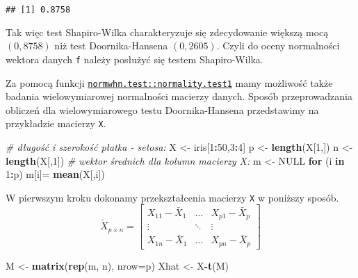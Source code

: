 \documentclass[polish,]{book}
\newenvironment{Shaded}{\begin{snugshade}}{\end{snugshade}}
\newcommand{\CommentTok}[1]{\textcolor[rgb]{0.56,0.35,0.01}{\textit{#1}}}
\newcommand{\ControlFlowTok}[1]{\textcolor[rgb]{0.13,0.29,0.53}{\textbf{#1}}}
\newcommand{\DataTypeTok}[1]{\textcolor[rgb]{0.13,0.29,0.53}{#1}}
\newcommand{\DecValTok}[1]{\textcolor[rgb]{0.00,0.00,0.81}{#1}}
\newcommand{\KeywordTok}[1]{\textcolor[rgb]{0.13,0.29,0.53}{\textbf{#1}}}
\newcommand{\NormalTok}[1]{#1}
\newcommand{\OperatorTok}[1]{\textcolor[rgb]{0.81,0.36,0.00}{\textbf{#1}}}
\newcommand{\OtherTok}[1]{\textcolor[rgb]{0.56,0.35,0.01}{#1}}
\newcommand{\StringTok}[1]{\textcolor[rgb]{0.31,0.60,0.02}{#1}}
\begin{document}
\begin{verbatim}
## [1] 0.8758
\end{verbatim}

Tak więc test Shapiro-Wilka charakteryzuje się zdecydowanie większą mocą \((0,8758)\) niż test Doornika-Hansena \((0,2605)\). Czyli do oceny normalności wektora danych \texttt{f} należy posłużyć się testem Shapiro-Wilka.

Za pomocą funkcji \href{https://rdrr.io/cran/normwhn.test/man/normality.test1.html}{\texttt{normwhn.test::normality.test1}} mamy możliwość także badania wielowymiarowej normalności macierzy danych. Sposób przeprowadzania obliczeń dla wielowymiarowego testu Doornika-Hansena przedstawimy na przykładzie macierzy \texttt{X}.

\begin{Shaded}
\begin{Highlighting}[]
\CommentTok{# długość i szerokość płatka - setosa:}
\NormalTok{X <-}\StringTok{ }\NormalTok{iris[}\DecValTok{1}\OperatorTok{:}\DecValTok{50}\NormalTok{,}\DecValTok{3}\OperatorTok{:}\DecValTok{4}\NormalTok{]}
\NormalTok{p <-}\StringTok{ }\KeywordTok{length}\NormalTok{(X[}\DecValTok{1}\NormalTok{,])}
\NormalTok{n <-}\StringTok{ }\KeywordTok{length}\NormalTok{(X[,}\DecValTok{1}\NormalTok{])}
\CommentTok{# wektor średnich dla kolumn macierzy X:}
\NormalTok{m <-}\StringTok{  }\OtherTok{NULL}
\ControlFlowTok{for}\NormalTok{ (i }\ControlFlowTok{in} \DecValTok{1}\OperatorTok{:}\NormalTok{p) m[i]=}\StringTok{ }\KeywordTok{mean}\NormalTok{(X[,i])}
\end{Highlighting}
\end{Shaded}

W pierwszym kroku dokonamy przekształcenia macierzy \texttt{X} w poniższy sposób.
\begin{equation}
\check{X}_{p \times n}=\left[
\begin{array}{*{4}{c}}
X_{11}-\bar{X}_1 & \ldots & X_{p1}-\bar{X}_p\\
\vdots & \ddots & \vdots\\
X_{1n}-\bar{X}_1 & \ldots & X_{pn}-\bar{X}_p
\end{array}
\right]
\label{eq:wz1124}
\end{equation}

\begin{Shaded}
\begin{Highlighting}[]
\NormalTok{M <-}\StringTok{  }\KeywordTok{matrix}\NormalTok{(}\KeywordTok{rep}\NormalTok{(m, n), }\DataTypeTok{nrow=}\NormalTok{p)}
\NormalTok{Xhat <-}\StringTok{ }\NormalTok{X}\OperatorTok{-}\KeywordTok{t}\NormalTok{(M)}
\end{Highlighting}
\end{Shaded}
\end{document}
